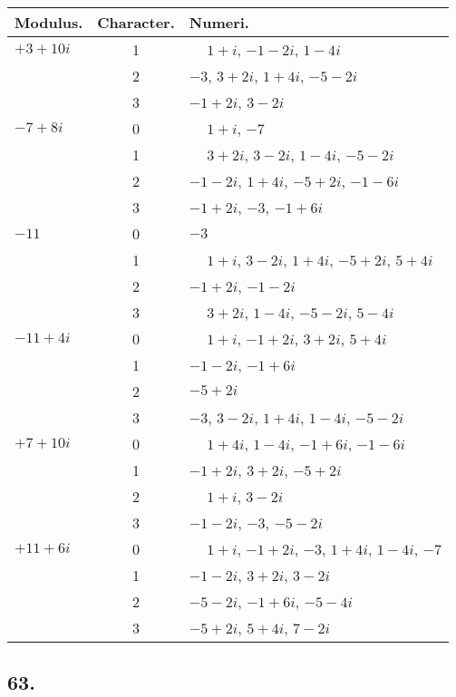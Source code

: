 \documentclass[twoside,12pt]{memoir}
\begin{document}
\begin{center}
\begin{tabular}{l|c|l}
Modulus. & Character. & Numeri. \\
\hline
\(+3+10 i\) & 1 & \(\phantom{+}1+i\), \(-1-2 i\), \(1-4 i\) \\
 & 2 & \(-3\), \(3+2 i\), \(1+4 i\), \(-5-2 i\) \\
 & 3 & \(-1+2 i\), \(3-2 i\) \\
\(-7+8 i\) & 0 & \(\phantom{+}1+i\), \(-7\) \\
 & 1 & \(\phantom{+}3+2 i\), \(3-2 i\), \(1-4 i\), \(-5-2 i\) \\
 & 2 & \(-1-2 i\), \(1+4 i\), \(-5+2 i\), \(-1-6 i\) \\
 & 3 & \(-1+2 i\), \(-3\), \(-1+6 i\) \\
\(-11\) & 0 & \(-3\) \\
 & 1 & \(\phantom{+}1+i\), \(3-2 i\), \(1+4 i\), \(-5+2 i\), \(5+4 i\) \\
 & 2 & \(-1+2 i\), \(-1-2 i\) \\
 & 3 & \(\phantom{+}3+2 i\), \(1-4 i\), \(-5-2 i\), \(5-4 i\) \\
\(-11+4 i\) & 0 & \(\phantom{+}1+i\), \(-1+2 i\), \(3+2 i\), \(5+4 i\) \\
 & 1 & \(-1-2 i\), \(-1+6 i\) \\
 & 2 & \(-5+2 i\) \\
 & 3 & \(-3\), \(3-2 i\), \(1+4 i\), \(1-4 i\), \(-5-2 i\) \\
\(+7+10 i\) & 0 & \(\phantom{+}1+4 i\), \(1-4 i\), \(-1+6 i\), \(-1-6 i\) \\
 & 1 & \(-1+2 i\), \(3+2 i\), \(-5+2 i\) \\
 & 2 & \(\phantom{+}1+i\), \(3-2 i\) \\
 & 3 & \(-1-2 i\), \(-3\), \(-5-2 i\) \\
\(+11+6 i\) & 0 & \(\phantom{+}1+i\), \(-1+2 i\), \(-3\), \(1+4 i\), \(1-4 i\), \(-7\) \\
 & 1 & \(-1-2 i\), \(3+2 i\), \(3-2 i\) \\
 & 2 & \(-5-2 i\), \(-1+6 i\), \(-5-4 i\) \\
 & 3 & \(-5+2 i\), \(5+4 i\), \(7-2 i\) \\
\end{tabular}
\end{center}
%

\subsection*{63.}
\end{document}
